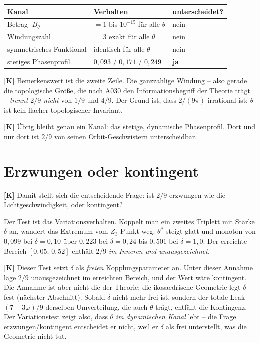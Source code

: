 \begin{center}
\begin{tabular}{lll}
\hline
Kanal & Verhalten & unterscheidet? \\
\hline
Betrag $|B_\theta|$ & $=1$ bis $10^{-15}$ für alle $\theta$ & nein \\
Windungszahl & $=3$ exakt für alle $\theta$ & nein \\
symmetrisches Funktional & identisch für alle $\theta$ & nein \\
stetiges Phasenprofil & $0{,}093$ / $0{,}171$ / $0{,}249$ & \textbf{ja} \\
\hline
\end{tabular}
\end{center}

\textbf{[K]} Bemerkenswert ist die zweite Zeile. Die ganzzahlige Windung -- also
gerade die topologische Größe, die nach A030 den Informationsbegriff der Theorie
trägt -- \emph{trennt $2/9$ nicht} von $1/9$ und $4/9$. Der Grund ist,
dass $2/(9\pi)$ irrational ist; $\theta$ ist kein flacher topologischer
Invariant.

\textbf{[K]} Übrig bleibt genau ein Kanal: das stetige, dynamische Phasenprofil.
Dort und nur dort ist $2/9$ von seinen Orbit-Geschwistern unterscheidbar.

\section{Erzwungen oder kontingent}

\textbf{[K]} Damit stellt sich die entscheidende Frage: ist $2/9$ erzwungen
wie die Lichtgeschwindigkeit, oder kontingent?

Der Test ist das Variationsverhalten. Koppelt man ein zweites Triplett mit
Stärke $\delta$ an, wandert das Extremum vom $Z_3$-Punkt weg:
$\theta^*$ steigt glatt und monoton von $0{,}099$ bei $\delta = 0{,}10$
über $0{,}223$ bei $\delta = 0{,}24$ bis $0{,}501$ bei $\delta = 1{,}0$.
Der erreichte Bereich $[0{,}05;\,0{,}52]$ enthält $2/9$ \emph{im Inneren und
unausgezeichnet}.

\textbf{[K]} Dieser Test setzt $\delta$ als \emph{freien} Kopplungsparameter an.
Unter dieser Annahme läge $2/9$ unausgezeichnet im erreichten Bereich, und der
Wert wäre kontingent. Die Annahme ist aber nicht die der Theorie: die
ikosaedrische Geometrie legt $\delta$ fest (nächster Abschnitt). Sobald $\delta$
nicht mehr frei ist, sondern der totale Leak $(7-3\varphi)/9$ derselben
Umverteilung, die auch $\theta$ trägt, entfällt die Kontingenz. Der
Variationstest zeigt also, dass $\theta$ \emph{im dynamischen Kanal} lebt -- die
Frage erzwungen/kontingent entscheidet er nicht, weil er $\delta$ als frei
unterstellt, was die Geometrie nicht tut.

